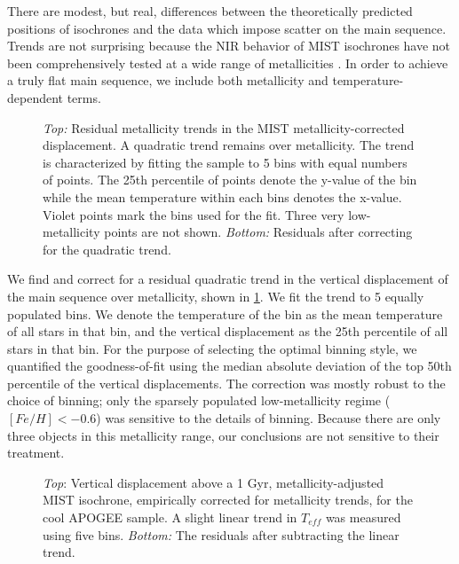 \documentclass[manuscript]{aastex6}
\newcommand{\Teff}{\ensuremath{T_{eff}}}
\begin{document}
There are modest, but real, differences between the theoretically predicted
positions of isochrones and the data which impose scatter on the main sequence. 
Trends are not surprising because the NIR behavior of MIST isochrones have not 
been comprehensively tested at a wide range of metallicities \citep{Choi16}. 
In order to achieve a truly flat main sequence, we include both 
metallicity and temperature-dependent terms.

\begin{figure}[htb]
    \centering
    \caption{\emph{Top:} Residual metallicity trends in the MIST 
        metallicity-corrected displacement. A quadratic trend remains over 
        metallicity. The trend is characterized by fitting the sample to 
        5 bins with equal numbers of points.  The 25th percentile of points 
        denote the y-value of the bin while the mean temperature within each
        bins denotes the x-value. Violet points mark the bins used for the fit. 
        Three very low-metallicity points are not shown. \emph{Bottom:} 
        Residuals after correcting for the quadratic trend.}\label{fig:met_trend}
\end{figure}

We find and correct for a residual quadratic trend in the vertical 
displacement of the main sequence over metallicity, shown in 
\cref{fig:met_trend}.  We fit the trend to 5 equally populated bins. We denote 
the temperature of the bin as the mean temperature of all stars in that bin, 
and the vertical displacement as the 25th percentile of all stars in that bin. 
For the purpose of selecting the optimal binning style, we quantified the 
goodness-of-fit using the median absolute deviation of the top 50th percentile 
of the vertical displacements. The correction was mostly robust to the choice 
of binning; only the sparsely populated low-metallicity regime 
(\([Fe/H] < -0.6\)) was sensitive to the details of binning. Because there are 
only three objects in this metallicity range, our conclusions are not 
sensitive to their treatment.

\begin{figure}[htb]
    \centering
    \caption{\emph{Top}: Vertical displacement above a 1 Gyr,
        metallicity-adjusted MIST isochrone, empirically corrected for
        metallicity trends, for the cool APOGEE sample. A 
        slight linear trend in \Teff{} was measured using five bins. 
        \emph{Bottom:} The residuals after subtracting the linear 
    trend.}\label{fig:apogee_teff_trend}
\end{figure}
\end{document}
